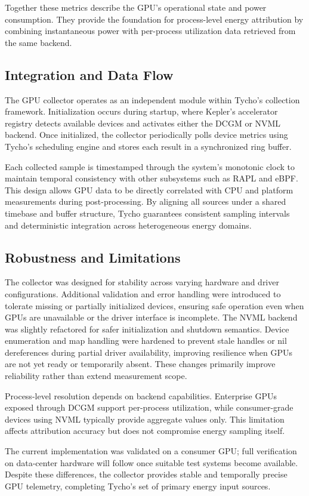 Together these metrics describe the GPU’s operational state and power consumption.  
They provide the foundation for process-level energy attribution by combining instantaneous power with per-process utilization data retrieved from the same backend.

\subsection{Integration and Data Flow}
\label{subsec:gpu_flow}

The GPU collector operates as an independent module within Tycho’s collection framework.  
Initialization occurs during startup, where Kepler’s accelerator registry detects available devices and activates either the DCGM or NVML backend.  
Once initialized, the collector periodically polls device metrics using Tycho’s scheduling engine and stores each result in a synchronized ring buffer.  

Each collected sample is timestamped through the system’s monotonic clock to maintain temporal consistency with other subsystems such as RAPL and eBPF.  
This design allows GPU data to be directly correlated with CPU and platform measurements during post-processing.  
By aligning all sources under a shared timebase and buffer structure, Tycho guarantees consistent sampling intervals and deterministic integration across heterogeneous energy domains.

\subsection{Robustness and Limitations}
\label{subsec:gpu_limitations}

The collector was designed for stability across varying hardware and driver configurations.  
Additional validation and error handling were introduced to tolerate missing or partially initialized devices, ensuring safe operation even when GPUs are unavailable or the driver interface is incomplete. The NVML backend was slightly refactored for safer initialization and shutdown semantics. Device enumeration and map handling were hardened to prevent stale handles or nil dereferences during partial driver availability, improving resilience when GPUs are not yet ready or temporarily absent.
These changes primarily improve reliability rather than extend measurement scope.

Process-level resolution depends on backend capabilities.  
Enterprise GPUs exposed through DCGM support per-process utilization, while consumer-grade devices using NVML typically provide aggregate values only.  
This limitation affects attribution accuracy but does not compromise energy sampling itself.  

The current implementation was validated on a consumer GPU; full verification on data-center hardware will follow once suitable test systems become available.  
Despite these differences, the collector provides stable and temporally precise GPU telemetry, completing Tycho’s set of primary energy input sources.

